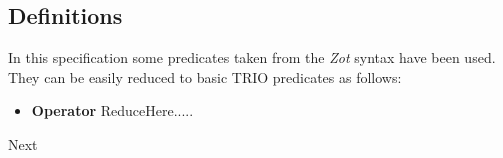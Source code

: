 \subsection{Definitions}

In this specification some predicates taken from the \textit{Zot} syntax have been used. They can be easily reduced to basic TRIO predicates as follows:
\begin {itemize}
\item \textbf{Operator} ReduceHere.....

\end {itemize}
Next
